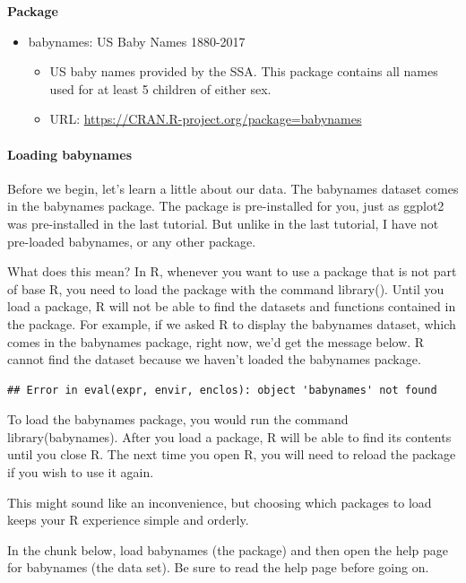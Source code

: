 \documentclass[
]{article}
\providecommand{\tightlist}{%
  \setlength{\itemsep}{0pt}\setlength{\parskip}{0pt}}
\begin{document}
\textbf{Package}

\begin{itemize}
\tightlist
\item
  babynames: US Baby Names 1880-2017

  \begin{itemize}
  \tightlist
  \item
    US baby names provided by the SSA. This package contains all names
    used for at least 5 children of either sex.
  \item
    URL: \url{https://CRAN.R-project.org/package=babynames}
  \end{itemize}
\end{itemize}

\hypertarget{loading-babynames}{%
\paragraph{Loading babynames}\label{loading-babynames}}

Before we begin, let's learn a little about our data. The babynames
dataset comes in the babynames package. The package is pre-installed for
you, just as ggplot2 was pre-installed in the last tutorial. But unlike
in the last tutorial, I have not pre-loaded babynames, or any other
package.

What does this mean? In R, whenever you want to use a package that is
not part of base R, you need to load the package with the command
library(). Until you load a package, R will not be able to find the
datasets and functions contained in the package. For example, if we
asked R to display the babynames dataset, which comes in the babynames
package, right now, we'd get the message below. R cannot find the
dataset because we haven't loaded the babynames package.

\begin{verbatim}
## Error in eval(expr, envir, enclos): object 'babynames' not found
\end{verbatim}

To load the babynames package, you would run the command
library(babynames). After you load a package, R will be able to find its
contents until you close R. The next time you open R, you will need to
reload the package if you wish to use it again.

This might sound like an inconvenience, but choosing which packages to
load keeps your R experience simple and orderly.

In the chunk below, load babynames (the package) and then open the help
page for babynames (the data set). Be sure to read the help page before
going on.
\end{document}

